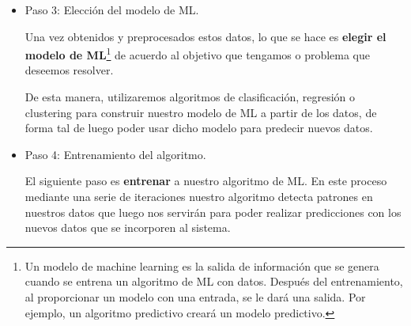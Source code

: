 \documentclass[12pt,a4paper]{article}
\begin{document}
\begin{sloppypar}
\begin{itemize}
En este paso generalmente se realizan visualizaciones de los datos y se revisa si existen correlaciones entre las distintas “features”\footnote{Features generalmente son las columnas de nuestro dataframe, archivo o base de datos -dependiendo cómo almacenamos nuestros datos-.} de nuestros datos. Al pre-procesar nuestros datos nos referimos a normalizar los mismos: eliminando duplicados y realizando distintas correcciones de errores. El preprocesamiento de datos usualmente tiene un impacto significativo en la performance de generalización de nuestro algoritmo de machine learning\cite{preprocessing}. 

\cleardoublepage
En esta etapa, además, es importante \textbf{separar} nuestros datos en dos grupos:
\begin{itemize}
\item un set de entrenamiento.
\item un set de prueba. 
\end{itemize}

Como mencionamos previamente, el set de test en general es un 20\% o 30\% del set de entrenamiento. Esta partición de los datos en estos dos conjuntos diferenciados permite generar el modelo a partir de los datos de entrenamiento para después comprobar su eficiencia con los datos reservados para test.\\

\item Paso 3: Elección del modelo de ML.

Una vez obtenidos y preprocesados estos datos, lo que se hace es \textbf{elegir el modelo de ML}\footnote{Un modelo de machine learning es la salida de información que se genera cuando se entrena un algoritmo de ML con datos. Después del entrenamiento, al proporcionar un modelo con una entrada, se le dará una salida. Por ejemplo, un algoritmo predictivo creará un modelo predictivo.} de acuerdo al objetivo que tengamos o problema que deseemos resolver. 

De esta manera, utilizaremos algoritmos de clasificación, regresión o clustering para construir nuestro modelo de ML a partir de los datos, de forma tal de luego poder usar dicho modelo para predecir nuevos datos.\\

\item Paso 4: Entrenamiento del algoritmo.

El siguiente paso es \textbf{entrenar} a nuestro algoritmo de ML. En este proceso mediante una serie de iteraciones nuestro algoritmo detecta patrones en nuestros datos que luego nos servirán para poder realizar predicciones con los nuevos datos que se incorporen al sistema.


\end{itemize}
\end{sloppypar}
\end{document}
